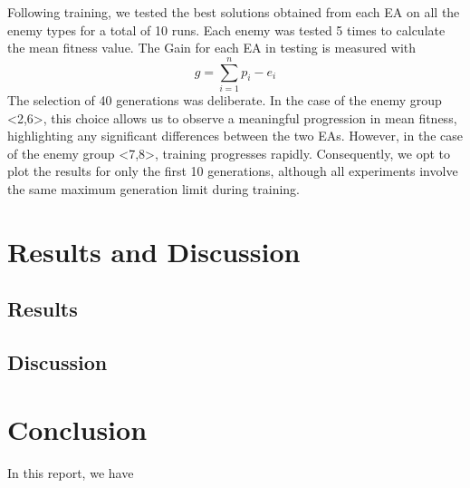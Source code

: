 Following training, we tested the best solutions obtained from each EA on all the enemy types for a total of 10 runs. Each enemy was tested 5 times to calculate the mean fitness value.
The Gain for each EA in testing is measured with 
\begin{equation}
    g = \sum \limits_{i = 1}^{n} p_i - e_i
\end{equation}
The selection of 40 generations was deliberate. In the case of the enemy group <2,6>, this choice allows us to observe a meaningful progression in mean fitness, highlighting any significant differences between the two EAs. However, in the case of the enemy group <7,8>, training progresses rapidly. Consequently, we opt to plot the results for only the first 10 generations, although all experiments involve the same maximum generation limit during training.

\section{Results and Discussion}
\begin{figure*}[htbp]
    \centering
    \begin{subfigure}[htbp]{0.41\textwidth}
        \centering
        \label{fig:gain_1}
    \end{subfigure}
    \hfill
    \begin{subfigure}[htbp]{0.55\textwidth}
        \centering
        \label{fig:gain_2}
    \end{subfigure}
    \label{fig:gain}
\end{figure*}
\subsection{Results}
\subsection{Discussion}
\section{Conclusion}
In this report, we have %
